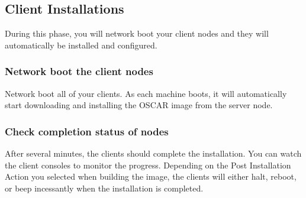 
\subsection{Client Installations}
\label{det:client-install}

During this phase, you will network boot your client nodes and they
will automatically be installed and configured.  


\subsubsection{Network boot the client nodes}


Network boot all of your clients.  As each machine boots, it will
automatically start downloading and installing the OSCAR image from
the server node.


\subsubsection{Check completion status of nodes}
\label{det:client-finish}

After several minutes, the clients should complete the installation.
You can watch the client consoles to monitor the progress. Depending
on the Post Installation Action you selected when building the image,
the clients will either halt, reboot, or beep incessantly when the
installation is completed.

  


